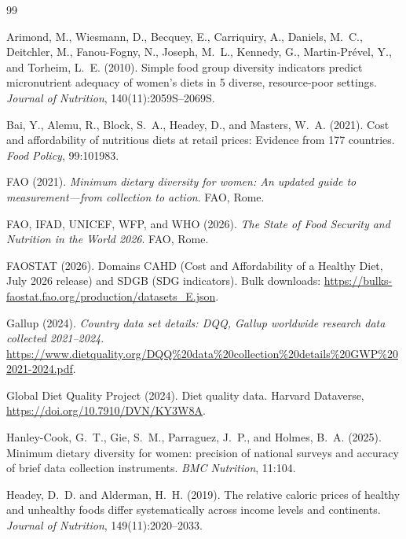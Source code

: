 \documentclass[11pt]{article}
\begin{document}

\begin{thebibliography}{99}

Arimond, M., Wiesmann, D., Becquey, E., Carriquiry, A., Daniels, M.~C., Deitchler, M., Fanou-Fogny, N., Joseph, M.~L., Kennedy, G., Martin-Pr\'evel, Y., and Torheim, L.~E. (2010).
Simple food group diversity indicators predict micronutrient adequacy of women's diets in 5 diverse, resource-poor settings.
\emph{Journal of Nutrition}, 140(11):2059S--2069S.

Bai, Y., Alemu, R., Block, S.~A., Headey, D., and Masters, W.~A. (2021).
Cost and affordability of nutritious diets at retail prices: Evidence from 177 countries.
\emph{Food Policy}, 99:101983.

FAO (2021).
\emph{Minimum dietary diversity for women: An updated guide to measurement---from collection to action}.
FAO, Rome.

FAO, IFAD, UNICEF, WFP, and WHO (2026).
\emph{The State of Food Security and Nutrition in the World 2026}.
FAO, Rome.

FAOSTAT (2026).
Domains CAHD (Cost and Affordability of a Healthy Diet, July 2026 release) and SDGB (SDG indicators).
Bulk downloads: \url{https://bulks-faostat.fao.org/production/datasets_E.json}.

Gallup (2024).
\emph{Country data set details: DQQ, Gallup worldwide research data collected 2021--2024}.
\url{https://www.dietquality.org/DQQ\%20data\%20collection\%20details\%20GWP\%202021-2024.pdf}.

Global Diet Quality Project (2024).
Diet quality data.
Harvard Dataverse, \url{https://doi.org/10.7910/DVN/KY3W8A}.

Hanley-Cook, G.~T., Gie, S.~M., Parraguez, J.~P., and Holmes, B.~A. (2025).
Minimum dietary diversity for women: precision of national surveys and accuracy of brief data collection instruments.
\emph{BMC Nutrition}, 11:104.

Headey, D.~D. and Alderman, H.~H. (2019).
The relative caloric prices of healthy and unhealthy foods differ systematically across income levels and continents.
\emph{Journal of Nutrition}, 149(11):2020--2033.


\end{thebibliography}
\end{document}
